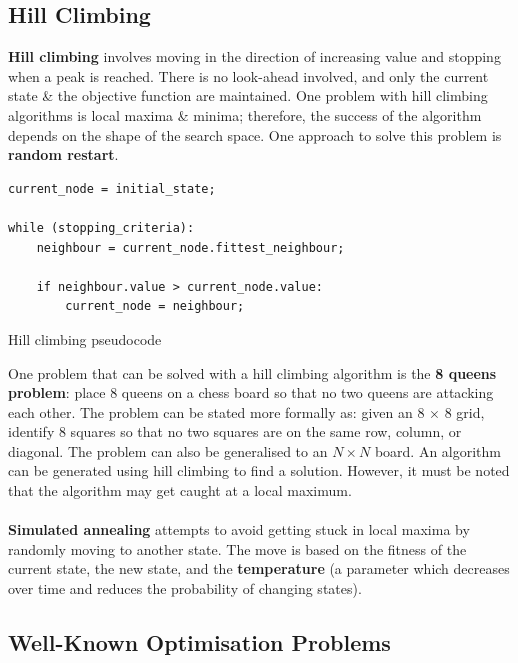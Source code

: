\documentclass[a4paper,11pt]{article}
\newenvironment{code}{\captionsetup{type=listing}}{}
\begin{document}
\subsection{Hill Climbing}
\textbf{Hill climbing} involves moving in the direction of increasing value and stopping when a peak is reached.
There is no look-ahead involved, and only the current state \& the objective function are maintained.
One problem with hill climbing algorithms is local maxima \& minima; therefore, the success of the algorithm depends on the shape of the search space.
One approach to solve this problem is \textbf{random restart}.

\begin{code}
\begin{verbatim}
current_node = initial_state;

while (stopping_criteria):
    neighbour = current_node.fittest_neighbour;

    if neighbour.value > current_node.value:
        current_node = neighbour;
\end{verbatim}
\caption{Hill climbing pseudocode}
\end{code}

One problem that can be solved with a hill climbing algorithm is the \textbf{8 queens problem}: place 8 queens on a chess board so that no two queens are attacking each other.
The problem can be stated more formally as: given an 8 $\times$ 8 grid, identify 8 squares so that no two squares are on the same row, column, or diagonal.
The problem can also be generalised to an $N \times N$ board.
An algorithm can be generated using hill climbing to find a solution.
However, it must be noted that the algorithm may get caught at a local maximum.
\\\\
\textbf{Simulated annealing} attempts to avoid getting stuck in local maxima by randomly moving to another state.
The move is based on the fitness of the current state, the new state, and the \textbf{temperature} (a parameter which decreases over time and reduces the probability of changing states).

\subsection{Well-Known Optimisation Problems}
\end{document}
